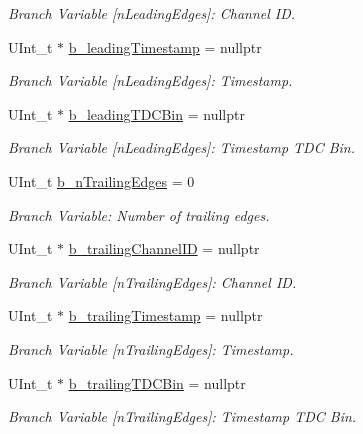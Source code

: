 \begin{DoxyCompactItemize}
\begin{DoxyCompactList}\small\item\em Branch Variable \mbox{[}n\+Leading\+Edges\mbox{]}\+: Channel ID. \end{DoxyCompactList}\item 
U\+Int\+\_\+t $\ast$ \hyperlink{class_packet_tree_manager_aaba5588ce24ffbbfaa7602f31856a438}{b\+\_\+leading\+Timestamp} = nullptr
\begin{DoxyCompactList}\small\item\em Branch Variable \mbox{[}n\+Leading\+Edges\mbox{]}\+: Timestamp. \end{DoxyCompactList}\item 
U\+Int\+\_\+t $\ast$ \hyperlink{class_packet_tree_manager_ae28ebfaf5833b8c5fa4fc264a50302dd}{b\+\_\+leading\+T\+D\+C\+Bin} = nullptr
\begin{DoxyCompactList}\small\item\em Branch Variable \mbox{[}n\+Leading\+Edges\mbox{]}\+: Timestamp T\+DC Bin. \end{DoxyCompactList}\item 
U\+Int\+\_\+t \hyperlink{class_packet_tree_manager_a64f60068f8f3d5d2531a61d11b877b85}{b\+\_\+n\+Trailing\+Edges} = 0
\begin{DoxyCompactList}\small\item\em Branch Variable\+: Number of trailing edges. \end{DoxyCompactList}\item 
U\+Int\+\_\+t $\ast$ \hyperlink{class_packet_tree_manager_ad8e33ea8a6cde82babd0a8a89225b4ae}{b\+\_\+trailing\+Channel\+ID} = nullptr
\begin{DoxyCompactList}\small\item\em Branch Variable \mbox{[}n\+Trailing\+Edges\mbox{]}\+: Channel ID. \end{DoxyCompactList}\item 
U\+Int\+\_\+t $\ast$ \hyperlink{class_packet_tree_manager_ac850c2a253026809b1118a572ede792c}{b\+\_\+trailing\+Timestamp} = nullptr
\begin{DoxyCompactList}\small\item\em Branch Variable \mbox{[}n\+Trailing\+Edges\mbox{]}\+: Timestamp. \end{DoxyCompactList}\item 
U\+Int\+\_\+t $\ast$ \hyperlink{class_packet_tree_manager_a80a9821f7a5d2af88a8daf4569f60e17}{b\+\_\+trailing\+T\+D\+C\+Bin} = nullptr
\begin{DoxyCompactList}\small\item\em Branch Variable \mbox{[}n\+Trailing\+Edges\mbox{]}\+: Timestamp T\+DC Bin. \end{DoxyCompactList}\end{DoxyCompactItemize}

